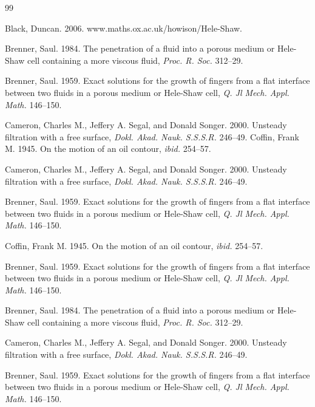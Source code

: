 \documentclass[fleqn]{jleo}
\begin{document}
\begin{thebibliography}{99}

Black, Duncan. 2006. www.maths.ox.ac.uk/howison/Hele-Shaw. 

Brenner, Saul. 1984. The penetration of a fluid into a porous
medium or Hele-Shaw cell containing a more viscous fluid, {\it Proc. R.
Soc.} 312--29.

Brenner, Saul. 1959. Exact solutions for the growth of fingers from a flat interface between two fluids in a porous medium or Hele-Shaw cell, {\it Q. Jl Mech. Appl. Math.} 146--150.

Cameron, Charles M., Jeffery A. Segal, and Donald Songer. 2000. Unsteady filtration with a  free surface, {\it Dokl. Akad. Nauk. S.S.S.R.}  246--49.          
Coffin, Frank M. 1945. On the motion
of an oil contour,  {\it ibid.} 254--57.

Cameron, Charles M., Jeffery A. Segal, and Donald Songer. 2000. Unsteady filtration with a  free surface, {\it Dokl. Akad. Nauk. S.S.S.R.}  246--49. 

Brenner, Saul. 1959. Exact solutions for the growth of fingers from a flat interface between two fluids in a porous medium or Hele-Shaw cell, {\it Q. Jl Mech. Appl. Math.} 146--150.


Coffin, Frank M. 1945. On the motion
of an oil contour,  {\it ibid.} 254--57.


Brenner, Saul. 1959. Exact solutions for the growth of fingers from a flat interface between two fluids in a porous medium or Hele-Shaw cell, {\it Q. Jl Mech. Appl. Math.} 146--150.


Brenner, Saul. 1984. The penetration of a fluid into a porous
medium or Hele-Shaw cell containing a more viscous fluid, {\it Proc. R.
Soc.} 312--29.


Cameron, Charles M., Jeffery A. Segal, and Donald Songer. 2000. Unsteady filtration with a  free surface, {\it Dokl. Akad. Nauk. S.S.S.R.}  246--49. 

Brenner, Saul. 1959. Exact solutions for the growth of fingers from a flat interface between two fluids in a porous medium or Hele-Shaw cell, {\it Q. Jl Mech. Appl. Math.} 146--150.



\end{thebibliography}
\end{document}
